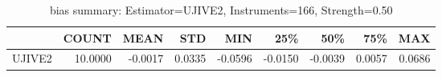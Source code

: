 \begin{table}[ht]
\centering
\caption{bias summary: Estimator=UJIVE2, Instruments=166, Strength=0.50}
\begin{tabular}{lrrrrrrrr}
\toprule
 & COUNT & MEAN & STD & MIN & 25\% & 50\% & 75\% & MAX \\
\midrule
UJIVE2 & 10.0000 & -0.0017 & 0.0335 & -0.0596 & -0.0150 & -0.0039 & 0.0057 & 0.0686 \\
\bottomrule
\end{tabular}
\end{table}
